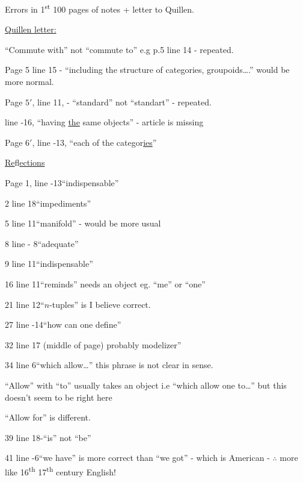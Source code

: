 \begin{center}Errors in 1\textsuperscript{st} 100 pages of notes + letter to Quillen.\end{center}

\uline{Quillen letter:}

``Commute with'' not ``commute to'' e.g p.5 line 14 - repeated.

Page 5 line 15 - ``including the structure of categories, groupoids\ldots.'' would be more normal.

Page $5'$, line 11, - ``standard'' not ``standart'' - repeated.

line -16, ``having \uline{the} same objects'' - article is missing

Page $6'$, line -13, ``each of the categor\uline{ies}''

\uline{Re}fl\uline{ections}

Page 1, line -13\quad ``indispensable''

2 line 18\quad ``impediments''

5 line 11\quad ``manifold'' - would be more usual

8 line - 8\quad ``adequate''

9 line 11\quad ``indispensable''

16 line 11\quad ``reminds'' needs an object eg. ``me'' or ``one''

21 line 12\quad ``$n$-tuples'' is I believe correct.

27 line -14\quad ``how can one define''

32 line 17 (middle of page) probably modelizer''

34 line 6\quad ``which allow\ldots'' this phrase is not clear in sense.

``Allow'' with ``to'' usually takes an object i.e ``which allow one to\ldots'' but this doesn't seem to be right here

``Allow for'' is different.

39 line 18-``is'' not ``be''

41 line -6\quad ``we have'' is more correct than ``we got'' - which is American - $\therefore$ more like 16\textsuperscript{th}  17\textsuperscript{th} century English!

